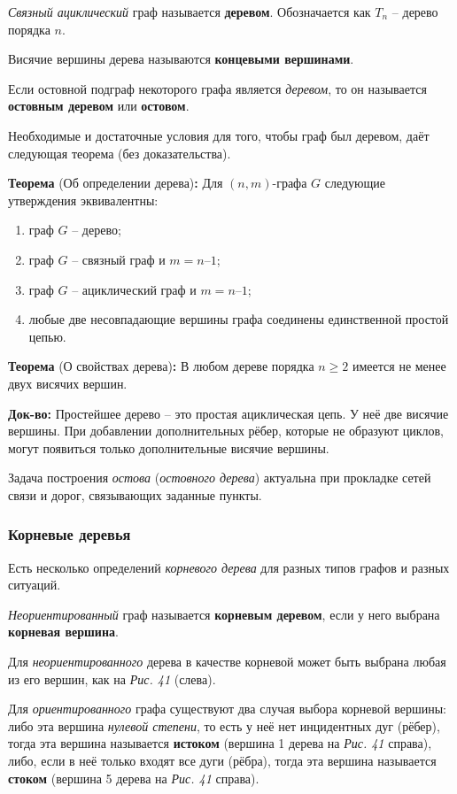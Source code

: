 \documentclass[12pt, a4paper]{article}
\begin{document}
\textit{Связный ациклический} граф называется \textbf{деревом}. Обозначается как $T_n$ -- дерево порядка $n$.

Висячие вершины дерева называются \textbf{концевыми вершинами}.

Если остовной подграф некоторого графа является \textit{деревом}, то он называется \textbf{остовным деревом} или \textbf{остовом}.

Необходимые и достаточные условия для того, чтобы граф был деревом, даёт следующая теорема (без доказательства).

\textbf{Теорема} (Об определении дерева)\textbf{:}
Для $(n,m)$-графа $G$ следующие утверждения эквивалентны:
\begin{enumerate}
\item граф $G$ -- дерево;
\item граф $G$ -- связный граф и $m = n – 1$;
\item граф $G$ -- ациклический граф и $m = n – 1$;
\item любые две несовпадающие вершины графа соединены единственной простой цепью.
\end{enumerate}

\textbf{Теорема} (О свойствах дерева)\textbf{:}
В любом дереве порядка $n \geq 2$ имеется не менее двух висячих вершин.

\textbf{Док-во:} Простейшее дерево -- это простая ациклическая цепь. У неё две висячие вершины. При добавлении дополнительных рёбер, которые не образуют циклов, могут появиться только дополнительные висячие вершины.

Задача построения \textit{остова} (\textit{остовного дерева}) актуальна при прокладке сетей связи и дорог, связывающих заданные пункты.

\subsubsection{Корневые деревья}

Есть несколько определений \textit{корневого дерева} для разных типов графов и разных ситуаций.

\textit{Неориентированный} граф называется \textbf{корневым деревом}, если у него выбрана \textbf{корневая вершина}.

Для \textit{неориентированного} дерева в качестве корневой может быть выбрана любая из его вершин, как на \textit{Рис. 41} (слева).

Для \textit{ориентированного} графа существуют два случая выбора корневой вершины: либо эта вершина \textit{нулевой степени}, то есть у неё нет инцидентных дуг (рёбер), тогда эта вершина называется \textbf{истоком} (вершина 1 дерева на \textit{Рис. 41} справа), либо, если в неё только входят все дуги (рёбра), тогда эта вершина называется \textbf{стоком} (вершина 5 дерева на \textit{Рис. 41} справа).
\end{document}
